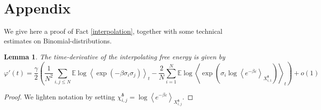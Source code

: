 \documentclass[a4paper,12pt,oneside,reqno]{amsart}
\numberwithin{equation}{section}
\newtheorem{lem}[teor]{Lemma}
\begin{document}
\section{Appendix}
We give here a proof of Fact \ref{interpolation}, together with some technical estimates on Binomial-distributions. 
\begin{lem}\label{lem_interp1}
The time-derivative of the interpolating free energy is given by
\[
\varphi'(t) = \frac{\gamma}{2}\left(\frac{1}{N^2}\sum\limits_{i,j\leq N}{{\mathbb{E}}} \log \left<\exp\left( -\beta \sigma_i \sigma_j\right)\right>_t -\frac{2}{N}\sum\limits_{i=1}^N  {{\mathbb{E}}} \log \left<\exp\left(\sigma_i \log \left<e^{-\beta\varepsilon}\right>_{X^{\boldsymbol{\delta}}_{i,1}}\right)\right>_t\right)+o(1)
\]
\end{lem}

\begin{proof}
We lighten notation by setting $\chi^{\boldsymbol{\delta}}_{i,j} = \log \left<e^{-\beta\varepsilon}\right>_{X^{\boldsymbol{\delta}}_{i,j}}$. 


\end{proof}
\end{document}
